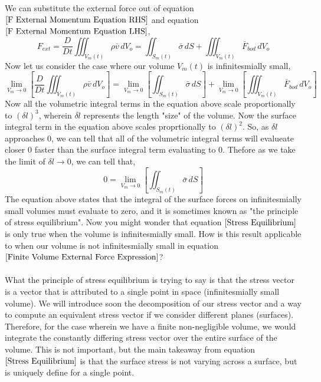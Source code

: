 We can substitute the external force out of equation $\ref{F External Momentum Equation RHS}$ and equation $\ref{F External Momentum Equation LHS}$,
\begin{equation}F_{ext} = \frac{D}{Dt}\iiint^{}_{V_{m}(t)} \rho \bar{v} \,dV_{o} = \iint^{}_{S_{m}(t)} \bar{\sigma} \,dS + \iiint^{}_{V_{m}(t)} \bar{F}_{bod} \,dV_{o} \label{Finite Volume External Force Expression}\end{equation}
Now let us consider the case where our volume $V_{m}(t)$ is infinitesmially small,
$$\lim_{V_{m}  \to 0}\left[\frac{D}{Dt}\iiint^{}_{V_{m}(t)} \rho \bar{v} \,dV_{o}\right] = \lim_{V_{m} \to 0}\left[\iint^{}_{S_{m}(t)} \bar{\sigma} \,dS\right] + \lim_{V_{m} \to 0}\left[\iiint^{}_{V_{m}(t)} \bar{F}_{bod} \,dV_{o}\right] $$
Now all the volumetric integral terms in the equation above scale proportionally to $(\delta l)^{3}$, wherein $\delta l$ represents the length "size" of the volume.
Now the surface integral term in the equation above scales proprtionally to $(\delta l)^{2}$.
So, as $\delta l$ approaches $0$, we can tell that all of the volumetric integral terms will evalueate closer $0$ faster than the surface integral term evaluating to $0$.
Thefore as we take the limit of $\delta l \to 0$, we can tell that,
\begin{equation}0 = \lim_{V_{m} \to 0}\left[\iint^{}_{S_{m}(t)} \bar{\sigma} \,dS\right] \label{Stress Equilibrium}\end{equation}
The equation above states that the integral of the surface forces on infinitesmially small volumes must evaluate to zero, and it is sometimes known as "the principle of stress equilibrium".
Now you might wonder that equation $\ref{Stress Equilibrium}$ is only true when the volume is infinitesmially small.
How is this result applicable to when our volume is not infinitesmially small in equation $\ref{Finite Volume External Force Expression}$?
\\~\\What the principle of stress equilibrium is trying to say is that the stress vector is a vector that is attributed to a single point in space (infinitesmially small volume).
We will introduce soon the decomposition of our stress vector and a way to compute an equivalent stress vector if we consider different planes (surfaces). 
Therefore, for the case wherein we have a finite non-negligible volume, we would integrate the constantly differing stress vector over the entire surface of the volume.
This is not important, but the main takeaway from equation $\ref{Stress Equilibrium}$ is that the surface stress is not varying across a surface, but is uniquely define for a single point.
